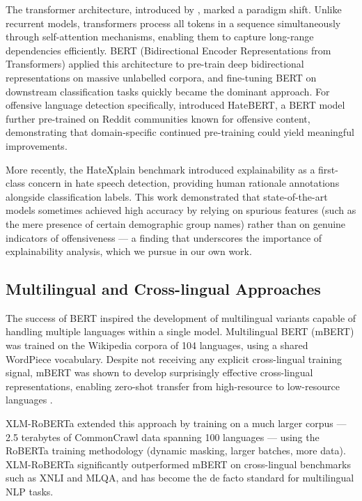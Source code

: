 \documentclass[12pt, a4paper]{article}
\begin{document}
The transformer architecture, introduced by \citet{vaswani2017attention}, marked a paradigm shift. Unlike recurrent models, transformers process all tokens in a sequence simultaneously through self-attention mechanisms, enabling them to capture long-range dependencies efficiently. BERT (Bidirectional Encoder Representations from Transformers) \citep{devlin2019bert} applied this architecture to pre-train deep bidirectional representations on massive unlabelled corpora, and fine-tuning BERT on downstream classification tasks quickly became the dominant approach. For offensive language detection specifically, \citet{caselli2021hatebert} introduced HateBERT, a BERT model further pre-trained on Reddit communities known for offensive content, demonstrating that domain-specific continued pre-training could yield meaningful improvements.

More recently, the HateXplain benchmark \citep{mathew2021hatexplain} introduced explainability as a first-class concern in hate speech detection, providing human rationale annotations alongside classification labels. This work demonstrated that state-of-the-art models sometimes achieved high accuracy by relying on spurious features (such as the mere presence of certain demographic group names) rather than on genuine indicators of offensiveness --- a finding that underscores the importance of explainability analysis, which we pursue in our own work.

\subsection{Multilingual and Cross-lingual Approaches}

The success of BERT inspired the development of multilingual variants capable of handling multiple languages within a single model. Multilingual BERT (mBERT) \citep{devlin2019bert} was trained on the Wikipedia corpora of 104 languages, using a shared WordPiece vocabulary. Despite not receiving any explicit cross-lingual training signal, mBERT was shown to develop surprisingly effective cross-lingual representations, enabling zero-shot transfer from high-resource to low-resource languages \citep{pires2019multilingual}.

XLM-RoBERTa \citep{conneau2020xlmr} extended this approach by training on a much larger corpus --- 2.5 terabytes of CommonCrawl data spanning 100 languages --- using the RoBERTa \citep{liu2019roberta} training methodology (dynamic masking, larger batches, more data). XLM-RoBERTa significantly outperformed mBERT on cross-lingual benchmarks such as XNLI and MLQA, and has become the de facto standard for multilingual NLP tasks.
\end{document}
